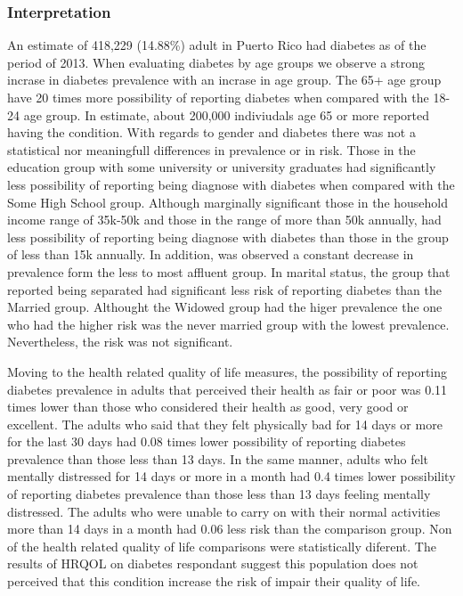 \newpage
 \subsubsection{Interpretation}

An estimate of 418,229 
(14.88\%) adult in Puerto Rico had diabetes as of the period of 2013.
When evaluating diabetes by age groups we observe a strong incrase in diabetes prevalence with an incrase in age group. The 65+ age group have 20 times more possibility of reporting diabetes when compared with the 18-24 age group. In estimate, about 200,000 indiviudals age 65 or more reported having the condition. With regards to gender and diabetes there was not a statistical nor meaningfull differences in prevalence or in risk.  Those in the education group with some university or university graduates had significantly less possibility of reporting being diagnose with diabetes when compared with the Some High School group.  Although marginally significant those in the household income range of 35k-50k and those in the range of more than 50k annually, had less possibility of reporting being diagnose with diabetes than those in the group of less than 15k annually. In addition, was observed a constant decrease in prevalence form the less to most affluent group. In marital status, the group that reported being separated had significant less risk  of reporting diabetes than the Married group. Althought the Widowed group had the higer prevalence the one who had the higher risk was the never married group with the lowest prevalence. Nevertheless, the risk was not significant.

Moving to the health related quality of life measures, the possibility of reporting diabetes prevalence in adults that perceived their health as fair or poor was 0.11 times lower than those who considered their health as good, very good or excellent. The adults who said that they felt physically bad for 14 days or more for the last 30 days had 0.08 times lower possibility of reporting diabetes prevalence than those less than 13 days. In the same manner, adults who felt mentally distressed for 14 days or more in a month had 0.4 times lower possibility of reporting diabetes prevalence than those less than 13 days feeling mentally distressed. The adults who were unable to carry on with their normal activities more than 14 days in a month had 0.06 less risk than the comparison group. Non of the health related quality of life comparisons were statistically diferent. The results of HRQOL on diabetes respondant suggest this population does not perceived that this condition increase the risk of impair their quality of life.


